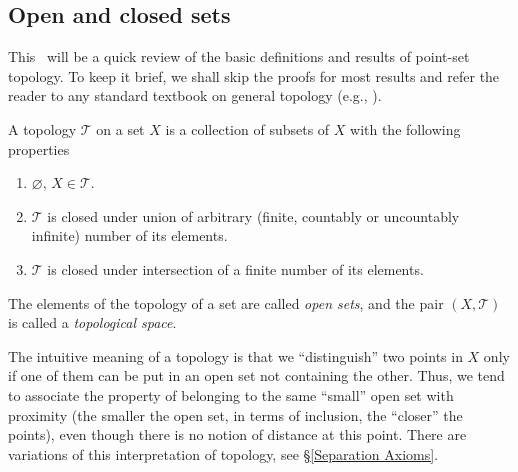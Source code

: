 \subsection{Open and closed sets}

This \sect\ will be a quick review of the basic definitions and results of point-set topology. To keep it brief, we shall skip the proofs for most results and refer the reader to any standard textbook on general topology (e.g., \cite{Munk}).

\begin{defn}[Topology]
    A topology $\mathcal{{T}}$ on a set $X$ is a collection of subsets
    of $X$ with the following properties
    \begin{enumerate}
    \item $\varnothing$, $X\in\mathcal{{T}}$.
    \item $\mathcal{{T}}$ is closed under union of arbitrary (finite, countably
    or uncountably infinite) number of its elements.
    \item $\mathcal{{T}}$ is closed under intersection of a finite number of
    its elements.
    \end{enumerate}
    The elements of the topology of a set are called \emph{open sets},
    and the pair $(X,\mathcal{{T}})$ is called a \emph{topological
    space}.
\end{defn}

The intuitive meaning of a topology is that we ``distinguish'' two points in $X$ only if one of them can be put in an open set not containing the other. Thus, we tend to associate the property of belonging to the same ``small'' open set with proximity (the smaller the open set, in terms of inclusion, the ``closer'' the points), even though there is no notion of distance at this point. There are variations of this interpretation of topology, see \S\ref{Separation Axioms}.

